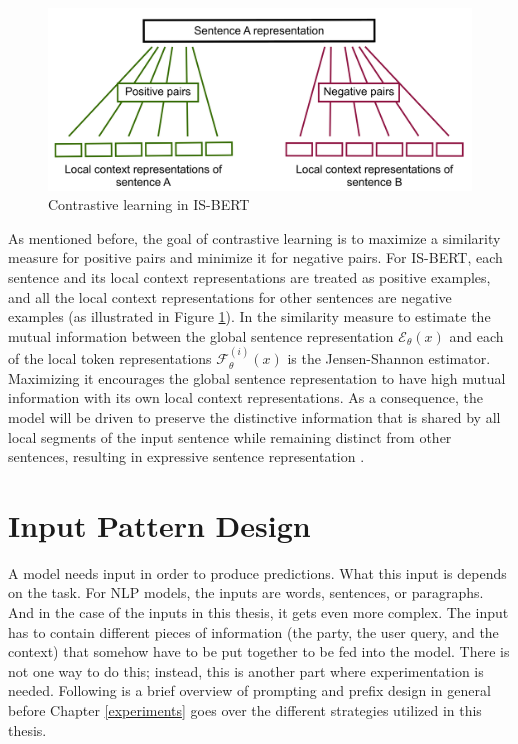 \begin{figure}[h!]
\centering
\includegraphics[width = 1\linewidth]{figures/IS-BERT2.png}
\caption{Contrastive learning in IS-BERT}
\label{fig:contrastive_learning}
\end{figure}

As mentioned before, the goal of contrastive learning is to maximize a similarity measure for positive pairs and minimize it for negative pairs. For IS-BERT, each sentence and its local context representations are treated as positive examples, and all the local context representations for other sentences are negative examples (as illustrated in Figure \ref{fig:contrastive_learning}). In \citet{zhang2020isbert} the similarity measure to estimate the mutual information between the global sentence representation $\mathcal{E}_\theta (x)$ and each of the local token representations $\mathcal{F}^{(i)}_\theta(x)$ is the Jensen-Shannon estimator. Maximizing it encourages the global sentence representation to have high mutual information with its own local context representations. As a consequence, the model will be driven to preserve the distinctive information that is shared by all local segments of the input sentence while remaining distinct from other sentences, resulting in expressive sentence representation \citep{zhang2020isbert}.

\section{Input Pattern Design}\label{input}

A model needs input in order to produce predictions. What this input is depends on the task. For NLP models, the inputs are words, sentences, or paragraphs. And in the case of the inputs in this thesis, it gets even more complex. The input has to contain different pieces of information (the party, the user query, and the context) that somehow have to be put together to be fed into the model. There is not one way to do this; instead, this is another part where experimentation is needed. Following is a brief overview of prompting and prefix design in general before Chapter \ref{experiments} goes over the different strategies utilized in this thesis.

